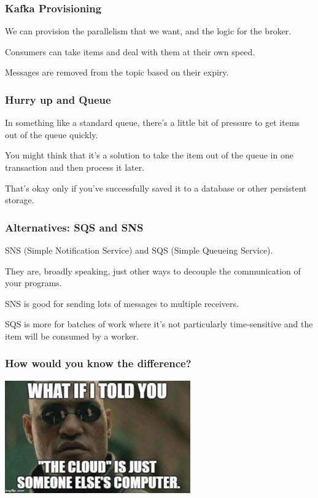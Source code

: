\begin{frame}
\frametitle{Kafka Provisioning}

We can provision the parallelism that we want, and the logic for the broker.

Consumers can take items and deal with them at their own speed.

Messages are removed from the topic based on their expiry.

\end{frame}


\begin{frame}
\frametitle{Hurry up and Queue}

In something like a standard queue, there's a little bit of pressure to get items out of the queue quickly.

You might think that it's a solution to take the item out of the queue in one transaction and then process it later.

That's okay only if you've successfully saved it to a database or other persistent storage. 

\end{frame}


\begin{frame}
\frametitle{Alternatives: SQS and SNS}

SNS (Simple Notification Service) and SQS (Simple Queueing Service). 

They are, broadly speaking, just other ways to decouple the communication of your programs.

SNS is good for sending lots of messages to multiple receivers.

SQS is more for batches of work where it's not particularly time-sensitive and the item will be consumed by a worker.

\end{frame}


\begin{frame}
\frametitle{How would you know the difference?}
\begin{center}
	\includegraphics[width=0.6\textwidth]{images/thecloud.jpg}
\end{center}
\end{frame}

